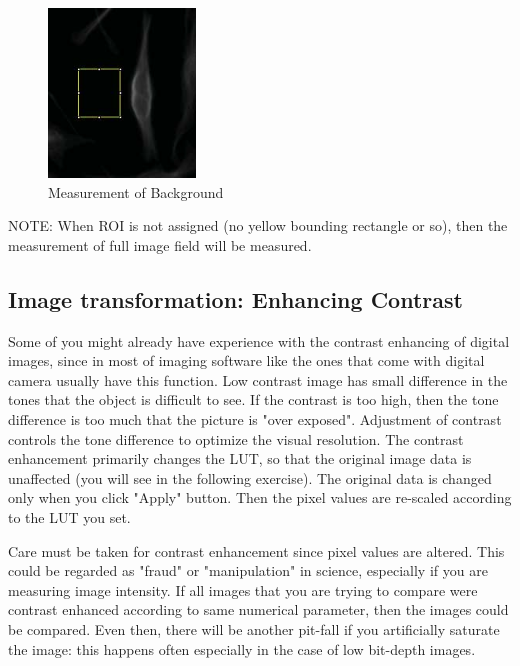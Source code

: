 \begin{indentexercise}{1}
\begin{figure}[htbp]
\begin{center}
\includegraphics[height=4.5cm]{fig/CMCIBasicCourse201102-img35.jpg}
\caption{Measurement of Background}
\label{fig:img35}
\end{center}
\end{figure}

\end{indentexercise}

NOTE: When ROI is not assigned (no yellow bounding rectangle or so),
then the measurement of full image field will be measured.

\subsection{Image transformation: Enhancing Contrast}
\label{subsec:enhancecontrast}
Some of you might already have experience with the contrast enhancing of
digital images, since in most of imaging software like the ones that
come with digital camera usually have this function. Low contrast image
has small difference in the tones that the object is difficult to see.
If the contrast is too high, then the tone difference is too much that
the picture is "over exposed".
Adjustment of contrast controls the tone difference to optimize the
visual resolution. The contrast enhancement primarily changes the LUT,
so that the original image data is unaffected (you will see in the
following exercise). The original data is changed only when you click
"Apply" button. Then the pixel values
are re-scaled according to the LUT you set.



Care must be taken for contrast enhancement since pixel values are
altered. This could be regarded as
"fraud" or
"manipulation" in science, especially if
you are measuring image intensity. If all images that you are trying to
compare were contrast enhanced according to same numerical parameter,
then the images could be compared. Even then, there will be another
pit-fall if you artificially saturate the image: this happens often
especially in the case of low bit-depth images. 

